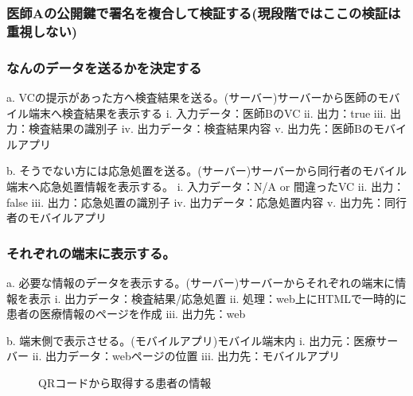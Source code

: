 \subsubsection{医師Aの公開鍵で署名を複合して検証する(現段階ではここの検証は重視しない)}
 
\subsubsection{なんのデータを送るかを決定する}
a.	VCの提示があった方へ検査結果を送る。(サーバー)サーバーから医師のモバイル端末へ検査結果を表示する 
i.	入力データ：医師BのVC 
ii.	出力：true 
iii.	出力：検査結果の識別子 
iv.	出力データ：検査結果内容 
v.	出力先：医師Bのモバイルアプリ 
 
 
b.	そうでない方には応急処置を送る。(サーバー)サーバーから同行者のモバイル端末へ応急処置情報を表示する。 
i.	入力データ：N/A or 間違ったVC 
ii.	出力：false 
iii.	出力：応急処置の識別子 
iv.	出力データ：応急処置内容 
v.	出力先：同行者のモバイルアプリ 
 
\subsubsection{それぞれの端末に表示する。}
a.	必要な情報のデータを表示する。(サーバー)サーバーからそれぞれの端末に情報を表示 
i.	出力データ：検査結果/応急処置 
ii.	処理：web上にHTMLで一時的に患者の医療情報のページを作成 
iii.	出力先：web 
 
 
b.	端末側で表示させる。(モバイルアプリ)モバイル端末内 
i.	出力元：医療サーバー 
ii.	出力データ：webページの位置 
iii.	出力先：モバイルアプリ 



\begin{figure}[htbp]
    \begin{center}
    \end{center}
    \caption{QRコードから取得する患者の情報}
    \label{fig:sample2}
\end{figure}


